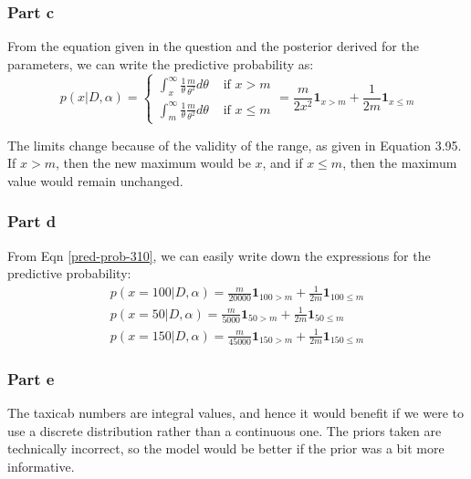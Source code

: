 \documentclass{article}
\begin{document}
\subsubsection*{Part c}
\begin{flushleft}
From the equation given in the question and the posterior derived for the parameters, we can write the predictive probability as:
\begin{equation}
\label{pred-prob-310}
p(x | D, \alpha) =
\begin{cases}
\displaystyle \int_{x}^{\infty} \frac{1}{\theta} \frac{m}{\theta^{2}} d\theta & \text{ if } x > m \\
\displaystyle \int_{m}^{\infty} \frac{1}{\theta} \frac{m}{\theta^{2}} d\theta & \text{ if } x \leq m
\end{cases}
= \frac{m}{2x^2}\mathbf{1}_{x > m} + \frac{1}{2m}\mathbf{1}_{x \leq m}
\end{equation}

The limits change because of the validity of the range, as given in Equation 3.95. If \(x > m\), then the new maximum would be \(x\), and if \(x \leq m\), then the maximum value would remain unchanged.
\end{flushleft}

\subsubsection*{Part d}
\begin{flushleft}
From Eqn \ref{pred-prob-310}, we can easily write down the expressions for the predictive probability:
\begin{gather}
p(x = 100 | D, \alpha) = \frac{m}{20000}\mathbf{1}_{100 > m} + \frac{1}{2m}\mathbf{1}_{100 \leq m}\\
p(x = 50 | D, \alpha) = \frac{m}{5000}\mathbf{1}_{50 > m} + \frac{1}{2m}\mathbf{1}_{50 \leq m}\\
p(x = 150 | D, \alpha) = \frac{m}{45000}\mathbf{1}_{150 > m} + \frac{1}{2m}\mathbf{1}_{150 \leq m}
\end{gather}
\end{flushleft}

\subsubsection*{Part e}
The taxicab numbers are integral values, and hence it would benefit if we were to use a discrete distribution rather than a continuous one. The priors taken are technically incorrect, so the model would be better if the prior was a bit more informative.
\end{document}
